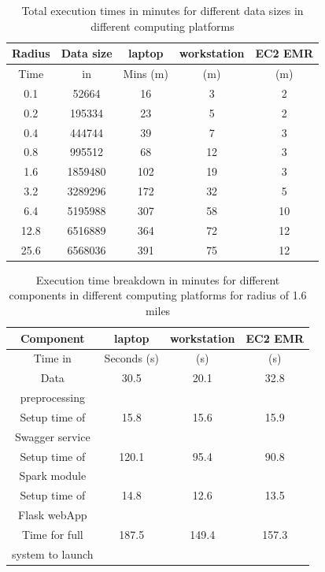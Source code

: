 \begin{table}[htb]
	\centering
	\caption{Total execution times in minutes for different data
        sizes in different computing platforms}\label{tab:performance}
	\begin{tabular}{*{5}{c}}
		\toprule
		Radius & Data size &  laptop & workstation &  EC2 EMR \\
		\midrule
		Time & in &  Mins (m) & (m) &  (m) \\
		\midrule
		0.1 & 52664  & 16  & 3 &  2 \\
		0.2 & 195334 & 23  & 5 &  2 \\
		0.4 & 444744 & 39  & 7 &  3 \\
		0.8 & 995512 & 68  & 12 &  3 \\
		1.6 & 1859480 & 102  & 19 &  3 \\
		3.2 & 3289296 & 172  & 32 &  5 \\
		6.4 & 5195988 &  307 & 58 &  10 \\
		12.8 & 6516889 & 364  & 72 &  12 \\
		25.6 & 6568036 & 391  & 75 &  12 \\

		\bottomrule
	\end{tabular}
\end{table}

\begin{table}[htb]
	\centering
	\caption{Execution time breakdown in minutes for different
        components in different computing platforms for radius of
        1.6 miles }\label{tab:performance_component}
	\begin{tabular}{*{4}{c}}
		\toprule
		Component & laptop & workstation &  EC2 EMR \\
		\midrule
		Time in & Seconds (s) & (s) &  (s) \\
		\midrule
		Data & 30.5  & 20.1 &  32.8 \\
		preprocessing  &   &  &   \\
		\midrule
		Setup time of  & 15.8  & 15.6 &  15.9 \\
		Swagger service  &   &  &   \\
		\midrule
		Setup time of  & 120.1  & 95.4 &  90.8 \\
		Spark module  &   &  &   \\
		\midrule
		Setup time of  & 14.8  & 12.6 &  13.5 \\
		Flask webApp  &   &  &   \\
		\midrule
		Time for full & 187.5  & 149.4 &  157.3 \\
		system to launch  &   &  &   \\
		\bottomrule
	\end{tabular}
\end{table}

